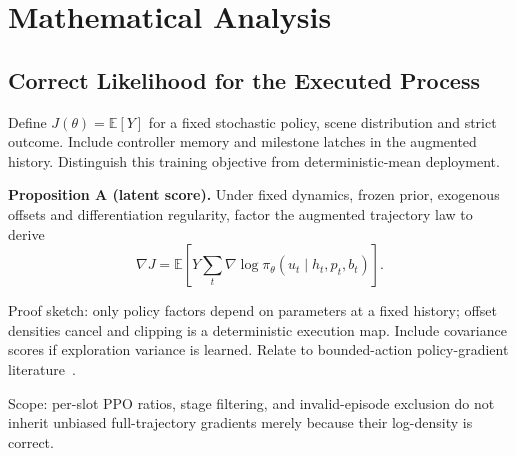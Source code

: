 \section{Mathematical Analysis}\label{sec:theory}
\subsection{Correct Likelihood for the Executed Process}
\begin{outline}
\item Define $J(\theta)=\mathbb E[Y]$ for a fixed stochastic policy, scene distribution and strict outcome. Include controller memory and milestone latches in the augmented history. Distinguish this training objective from deterministic-mean deployment.
\item \textbf{Proposition A (latent score).} Under fixed dynamics, frozen prior, exogenous offsets and differentiation regularity, factor the augmented trajectory law to derive
\begin{equation}
\nabla J=\mathbb E\!\left[Y\sum_t\nabla\log\pi_\theta(u_t\mid h_t,p_t,b_t)\right].
\end{equation}
\item Proof sketch: only policy factors depend on parameters at a fixed history; offset densities cancel and clipping is a deterministic execution map. Include covariance scores if exploration variance is learned. Relate to bounded-action policy-gradient literature~\cite{capg}.
\item Scope: per-slot PPO ratios, stage filtering, and invalid-episode exclusion do not inherit unbiased full-trajectory gradients merely because their log-density is correct.
\end{outline}
